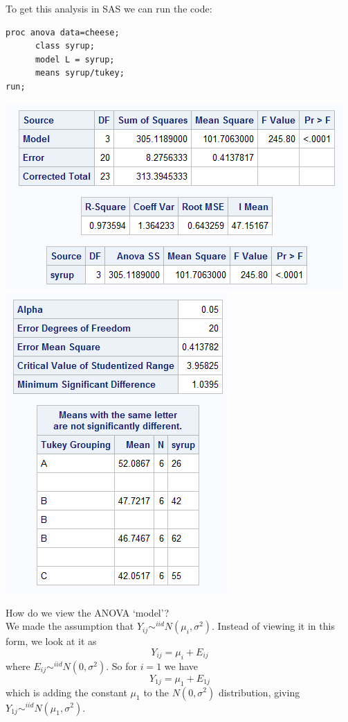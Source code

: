 \newpage

To get this analysis in SAS we can run the code:\\
\begin{verbatim}
proc anova data=cheese;
      class syrup;
      model L = syrup;
      means syrup/tukey;
run;
\end{verbatim}

\begin{flushleft}
\includegraphics[scale=0.85]{coloranova1}\\
\includegraphics[scale=0.85]{coloranova2}
\end{flushleft}

\newpage

\Large How do we view the ANOVA `model'?\normalsize \\
We made the assumption that $Y_{ij}\sim^{iid}N(\mu_{i},\sigma^2)$.  Instead of viewing it in this form, we look at it as
$$Y_{ij}=\mu_{i}+E_{ij}$$
where $E_{ij}\sim^{iid}N(0,\sigma^2)$.  So for $i=1$ we have
$$Y_{1j}=\mu_{1}+E_{1j}$$
which is adding the constant $\mu_1$ to the $N(0,\sigma^2)$ distribution, giving $Y_{1j}\sim^{iid}N(\mu_{1},\sigma^2)$.\\~\\~\\

